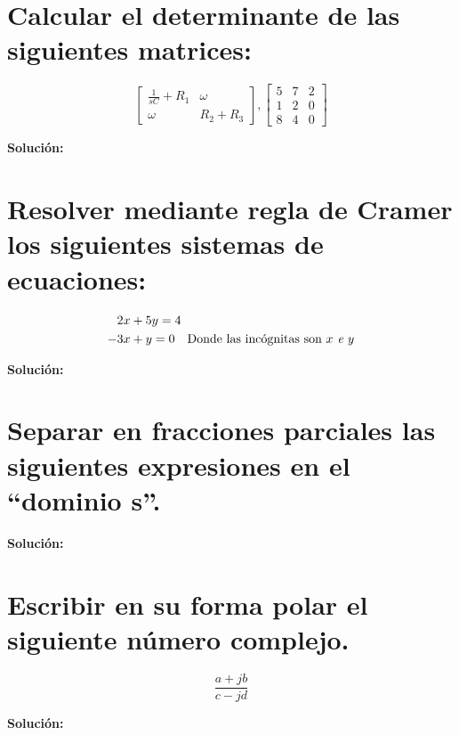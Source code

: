 \documentclass[
  11pt,
  letterpaper,
  answers
]{exam}
\begin{document}
\begin{questions}

\begin{parts}
    \part{Calcular el determinante de las siguientes matrices:}
\[
\begin{bmatrix}
    \frac{1}{sC} + R_1 & \omega \\
    \omega & R_2 + R_3
\end{bmatrix},
\begin{bmatrix}
    5 & 7 & 2 \\
    1 & 2 & 0 \\
    8 & 4 & 0
\end{bmatrix}
\]
\begin{mdframed}
\textbf{Solución:}

\end{mdframed}

\part{Resolver mediante regla de Cramer los siguientes sistemas de ecuaciones:}

\begin{equation*}
\begin{aligned}
    &2x + 5y = 4 \\
    -&3x + y = 0 \quad \text{Donde las incógnitas son \textit{\(x\) e \(y\)}}
\end{aligned}
\end{equation*}

\begin{mdframed}
\textbf{Solución:}

\end{mdframed}

\part{Separar en fracciones parciales las siguientes expresiones en el ``dominio s''.}
\begin{mdframed}
\textbf{Solución:}
\end{mdframed}

\part{Escribir en su forma polar el siguiente número complejo.}
\[
\frac{a + jb}{c - jd}
\]
\begin{mdframed}
\textbf{Solución:}
\end{mdframed}
\end{parts}
\end{questions}
\end{document}
